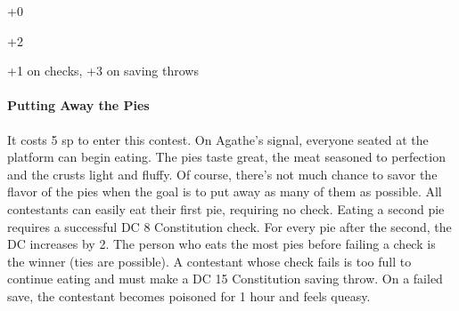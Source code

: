 \documentclass[10pt,a4paper,twoside,bg=print,twocolumn,openany,nodeprecatedcode]{dndbook}
\begin{document}
\begin{description}[nolistsep]
\item[Male Drow.]
+0
\item[Female Halfling.]
+2
\item[Irvan Wastewalker.]
+1 on checks, +3 on saving throws
\end{description}

\paragraph{Putting Away the Pies}
It costs 5 sp to enter this contest. On Agathe's signal, everyone seated at the platform can begin eating. The pies taste great, the meat seasoned to perfection and the crusts light and fluffy. Of course, there's not much chance to savor the flavor of the pies when the goal is to put away as many of them as possible.
All contestants can easily eat their first pie, requiring no check. Eating a second pie requires a successful DC 8 Constitution check. For every pie after the second, the DC increases by 2. The person who eats the most pies before failing a check is the winner (ties are possible). A contestant whose check fails is too full to continue eating and must make a DC 15 Constitution saving throw. On a failed save, the contestant becomes poisoned for 1 hour and feels queasy.
\end{document}
